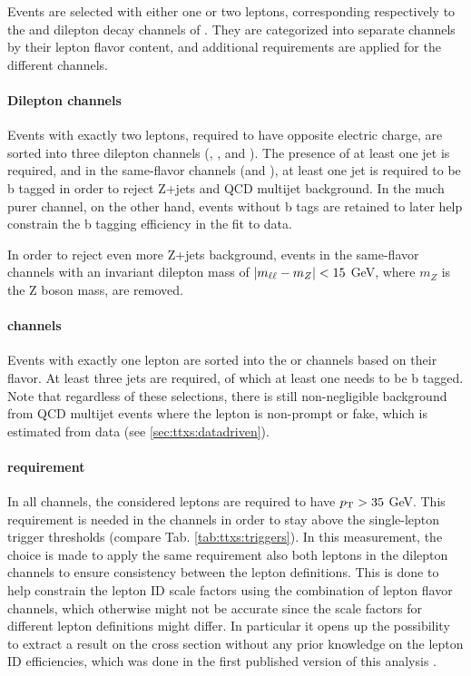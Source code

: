 Events are selected with either one or two leptons, corresponding respectively to the \ljets and dilepton decay channels of \ttbar. They are categorized into separate channels by their lepton flavor content, and additional requirements are applied for the different channels. 

\paragraph{Dilepton channels}

Events with exactly two leptons, required to have opposite electric charge, are sorted into three dilepton channels (\emu, \ee, and \mumu). The presence of at least one jet is required, and in the same-flavor channels (\ee and \mumu), at least one jet is required to be b tagged in order to reject Z+jets and QCD multijet background. In the much purer \emu channel, on the other hand, events without b tags are retained to later help constrain the b tagging efficiency in the fit to data.

In order to reject even more Z+jets background, events in the same-flavor channels with an invariant dilepton mass of $| m_{\ell\ell} - m_Z | < 15$ GeV, where $m_Z$ is the Z boson mass, are removed.

\paragraph{\ljets channels}

Events with exactly one lepton are sorted into the \ejets or \mujets channels based on their flavor. At least three jets are required, of which at least one needs to be b tagged. Note that regardless of these selections, there is still non-negligible background from QCD multijet events where the lepton is non-prompt or fake, which is estimated from data (see \cref{sec:ttxs:datadriven}).

\paragraph{\pt requirement}

In all channels, the considered leptons are required to have $p_{\mathrm{T}} > 35$ GeV. This requirement is needed in the \ljets channels in order to stay above the single-lepton trigger \pt thresholds (compare Tab. \ref{tab:ttxs:triggers}). In this measurement, the choice is made to apply the same \pt requirement also both leptons in the dilepton channels to ensure consistency between the lepton definitions. This is done to help constrain the lepton ID scale factors using the combination of lepton flavor channels, which otherwise might not be accurate since the scale factors for different lepton definitions might differ. In particular it opens up the possibility to extract a result on the cross section without any prior knowledge on the lepton ID efficiencies, which was done in the first published version of this analysis \cite{CMS:TOP-22-012-PAS}. %

